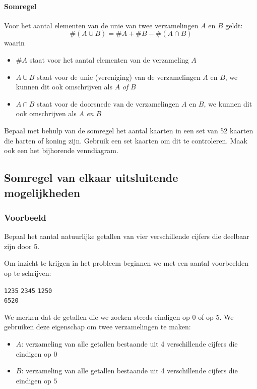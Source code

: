 \documentclass[12pt,a4paper,twoside]{article}
\begin{document}
\paragraph*{Somregel}
\begin{mdframed}
Voor het aantal elementen van de unie van twee verzamelingen $A$ en $B$ geldt:
$$\#(A \cup B) = \#A + \#B - \#(A \cap B)$$
waarin
\begin{itemize}
  \item $\#A$ staat voor het aantal elementen van de verzameling $A$
  \item $A\cup B$ staat voor de unie (vereniging) van de verzamelingen $A$ en $B$, we kunnen dit ook omschrijven als $A$ {\em of} $B$
  \item $A\cap B$ staat voor de doorsnede van de verzamelingen $A$ en $B$, we kunnen dit ook omschrijven als $A$ {\em en} $B$
\end{itemize}
\end{mdframed}

\begin{oefening}
Bepaal met behulp van de somregel het aantal kaarten in een set van 52 kaarten die harten of koning zijn. Gebruik een set kaarten om dit te controleren. Maak ook een het bijhorende venndiagram.
\end{oefening}

\subsection{Somregel van elkaar uitsluitende mogelijkheden}

\subsubsection*{Voorbeeld}

Bepaal het aantal natuurlijke getallen van vier verschillende cijfers die deelbaar zijn door 5.

Om inzicht te krijgen in het probleem beginnen we met een aantal voorbeelden op te schrijven:
\begin{center}
  \texttt{1235} \qquad \texttt{2345} \qquad \texttt{1250} \\
  \texttt{} \qquad \texttt{6520} \qquad \texttt{}
\end{center}

We merken dat de getallen die we zoeken steeds eindigen op $0$ of op $5$. We gebruiken deze eigenschap om twee verzamelingen te maken:
\begin{itemize}
\item $A$: verzameling van alle getallen bestaande uit 4 verschillende cijfers die eindigen op $0$
\item $B$: verzameling van alle getallen bestaande uit 4 verschillende cijfers die eindigen op $5$
\end{itemize}
\end{document}
